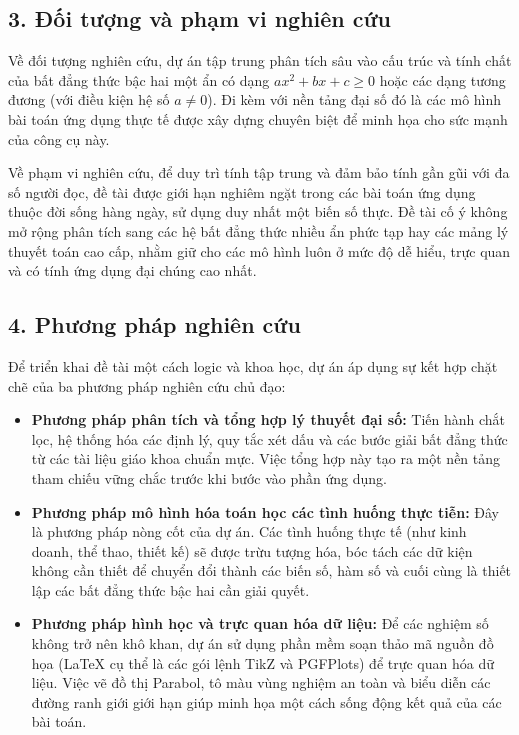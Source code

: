 \documentclass[14pt, a4paper, oneside]{extreport}
\begin{document}
\subsection*{3. Đối tượng và phạm vi nghiên cứu}
Về đối tượng nghiên cứu, dự án tập trung phân tích sâu vào cấu trúc và tính chất của bất đẳng thức bậc hai một ẩn có dạng $ax^2 + bx + c \ge 0$ hoặc các dạng tương đương (với điều kiện hệ số $a \neq 0$). Đi kèm với nền tảng đại số đó là các mô hình bài toán ứng dụng thực tế được xây dựng chuyên biệt để minh họa cho sức mạnh của công cụ này.

Về phạm vi nghiên cứu, để duy trì tính tập trung và đảm bảo tính gần gũi với đa số người đọc, đề tài được giới hạn nghiêm ngặt trong các bài toán ứng dụng thuộc đời sống hàng ngày, sử dụng duy nhất một biến số thực. Đề tài cố ý không mở rộng phân tích sang các hệ bất đẳng thức nhiều ẩn phức tạp hay các mảng lý thuyết toán cao cấp, nhằm giữ cho các mô hình luôn ở mức độ dễ hiểu, trực quan và có tính ứng dụng đại chúng cao nhất.

\subsection*{4. Phương pháp nghiên cứu}
Để triển khai đề tài một cách logic và khoa học, dự án áp dụng sự kết hợp chặt chẽ của ba phương pháp nghiên cứu chủ đạo:
\begin{itemize}
    \item \textbf{Phương pháp phân tích và tổng hợp lý thuyết đại số:} Tiến hành chắt lọc, hệ thống hóa các định lý, quy tắc xét dấu và các bước giải bất đẳng thức từ các tài liệu giáo khoa chuẩn mực. Việc tổng hợp này tạo ra một nền tảng tham chiếu vững chắc trước khi bước vào phần ứng dụng.
    \item \textbf{Phương pháp mô hình hóa toán học các tình huống thực tiễn:} Đây là phương pháp nòng cốt của dự án. Các tình huống thực tế (như kinh doanh, thể thao, thiết kế) sẽ được trừu tượng hóa, bóc tách các dữ kiện không cần thiết để chuyển đổi thành các biến số, hàm số và cuối cùng là thiết lập các bất đẳng thức bậc hai cần giải quyết.
    \item \textbf{Phương pháp hình học và trực quan hóa dữ liệu:} Để các nghiệm số không trở nên khô khan, dự án sử dụng phần mềm soạn thảo mã nguồn đồ họa (LaTeX cụ thể là các gói lệnh TikZ và PGFPlots) để trực quan hóa dữ liệu. Việc vẽ đồ thị Parabol, tô màu vùng nghiệm an toàn và biểu diễn các đường ranh giới giới hạn giúp minh họa một cách sống động kết quả của các bài toán.
\end{itemize}
\end{document}
